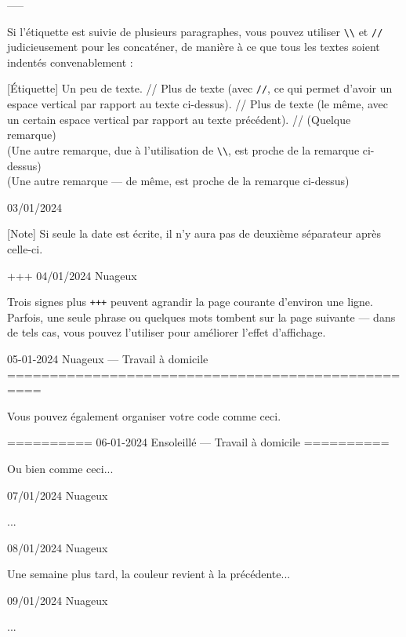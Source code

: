 \documentclass[11pt, paperstyle=light yellow, color entry, day-month-year,
  title in boldface, title in sffamily, use style = classical]{jwjournal}
\begin{document}
  -----

  Si l'étiquette est suivie de plusieurs paragraphes, vous pouvez utiliser \texttt{\textbackslash\textbackslash} et \texttt{\slash\slash} judicieusement pour les concaténer, de manière à ce que tous les textes soient indentés convenablement :

  [Étiquette] Un peu de texte.
    //
    Plus de texte (avec \texttt{\slash\slash}, ce qui permet d'avoir un espace vertical par rapport au texte ci-dessus).
    //
    Plus de texte (le même, avec un certain espace vertical par rapport au texte précédent).
    //
    (Quelque remarque)
    \\
    (Une autre remarque, due à l'utilisation de \texttt{\textbackslash\textbackslash}, est proche de la remarque ci-dessus)
    \\
    (Une autre remarque --- de même, est proche de la remarque ci-dessus)



03/01/2024

  [Note] Si seule la date est écrite, il n'y aura pas de deuxième séparateur après celle-ci.


+++
04/01/2024  Nuageux

  Trois signes plus \texttt{+++} peuvent agrandir la page courante d'environ une ligne. Parfois, une seule phrase ou quelques mots tombent sur la page suivante --- dans de tels cas, vous pouvez l'utiliser pour améliorer l'effet d'affichage.



05-01-2024    Nuageux       --- Travail à domicile
==================================================

Vous pouvez également organiser votre code comme ceci.


==========
06-01-2024    Ensoleillé    --- Travail à domicile
==========

Ou bien comme ceci...



07/01/2024  Nuageux

  ...



08/01/2024  Nuageux

  Une semaine plus tard, la couleur revient à la précédente...



09/01/2024  Nuageux

  ...
\end{document}
